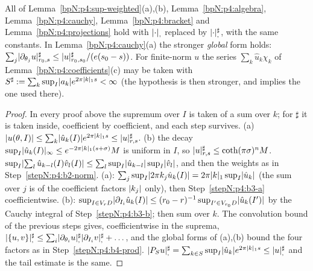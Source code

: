 \begin{lemma}\label{bpN:p4:sharp}
All of Lemma~\ref{bpN:p4:sup-weighted}(a),(b), Lemma~\ref{bpN:p4:algebra}, Lemma~\ref{bpN:p4:cauchy}, Lemma~\ref{bpN:p4:bracket} and Lemma~\ref{bpN:p4:projections} hold with $\lvert \cdot\rvert_{,}$ replaced by $\lvert \cdot\rvert_{,}^\sharp$, with the same constants. In Lemma~\ref{bpN:p4:cauchy}(a) the stronger \emph{global} form holds:
$\sum_j\lvert \partial_{\theta_j}u\rvert_{r_0,s}^\sharp\le\lvert u\rvert_{r_0,s_0}^\sharp/(e(s_0-s))$. For finite-norm $u$ the series $\sum_k\hat u_k\chi_k$ of Lemma~\ref{bpN:p4:coefficients}(c) may be taken with $S^\sharp:=\sum_k\sup_I\lvert a_k\rvert e^{2\pi\lvert k\rvert_1s}<\infty$ (the hypothesis is then stronger, and implies the one used there).
\end{lemma}
\begin{proof}
In every proof above the supremum over $I$ is taken of a sum over $k$; for $\sharp$ it is taken inside, coefficient by coefficient, and each step survives.
\label{stepN:p4:sh-b1} (a) $\lvert u(\theta,I)\rvert\le\sum_k\lvert \hat u_k(I)\rvert e^{2\pi\lvert k\rvert_1s}\le\lvert u\rvert_{r,s}^\sharp$. (b) the decay $\sup_I\lvert \hat u_k(I)\rvert_\infty\le e^{-2\pi\lvert k\rvert_1(s+\sigma)}M$ is uniform in $I$, so $\lvert u\rvert_{r,s}^\sharp\le\coth(\pi\sigma)^nM$.
\label{stepN:p4:sh-b2} $\sup_I\lvert \sum_l\hat u_{k-l}(I)\hat v_l(I)\rvert\le\sum_l\sup_I\lvert \hat u_{k-l}\rvert\sup_I\lvert \hat v_l\rvert$, and then the weights as in Step~\ref{stepN:p4:b2-norm}.
\label{stepN:p4:sh-b3} (a): $\sum_j\sup_I\lvert 2\pi k_j\hat u_k(I)\rvert=2\pi\lvert k\rvert_1\sup_I\lvert \hat u_k\rvert$ (the sum over $j$ is of the coefficient factors $\lvert k_j\rvert$ only), then Step~\ref{stepN:p4:b3-a} coefficientwise. (b): $\sup_{I\in V_rD}\lvert \partial_{I_i}\hat u_k(I)\rvert\le(r_0-r)^{-1}\sup_{I'\in V_{r_0}D}\lvert \hat u_k(I')\rvert$ by the Cauchy integral of Step~\ref{stepN:p4:b3-b}; then sum over $k$.
\label{stepN:p4:sh-b4} The convolution bound of the previous steps gives, coefficientwise in the suprema, $\lvert \{u,v\}\rvert_{,}^\sharp\le\sum_i\lvert \partial_{\theta_i}u\rvert_{,}^\sharp\lvert \partial_{I_i}v\rvert_{,}^\sharp+\dots$, and the global forms of (a),(b) bound the four factors as in Step~\ref{stepN:p4:b4-prod}.
\label{stepN:p4:sh-pr} $\lvert P_Su\rvert_{,}^\sharp=\sum_{k\in S}\sup_I\lvert \hat u_k\rvert e^{2\pi\lvert k\rvert_1s}\le\lvert u\rvert_{,}^\sharp$ and the tail estimate is the same.
\end{proof}

